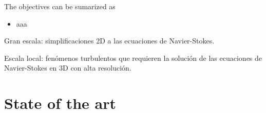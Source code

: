 The objectives can be sumarized as
\begin{itemize}
    \item aaa
\end{itemize}

Gran escala: simplificaciones 2D a las ecuaciones de Navier-Stokes.

Escala local: fenómenos turbulentos que requieren la solución de las ecuaciones de Navier-Stokes en 3D con alta resolución.


\section{State of the art}


